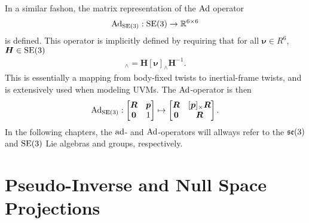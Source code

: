 In a similar fashon, the matrix representation of the $\operatorname{Ad}$ operator
\begin{align}
    \operatorname{Ad}_{\operatorname{SE}(3)} : \operatorname{SE}(3) \to \mathbb{R}^{6 \times 6}
\end{align}
is defined. This operator is implicitly defined by requiring that for all
$\bm{\nu} \in R^6$, $\bm{H} \in \operatorname{SE}(3)$
\begin{align}
    [\Ad(\bm{H})\bm{\nu}]_{\wedge} = \bm{H} [\bm{\nu}]_{\wedge} \bm{H}^{-1}.
\end{align}
This is essentially a mapping from body-fixed twists to inertial-frame twists,
and is extensively used when modeling UVMs. The $\operatorname{Ad}$-operator is then
\begin{align}
    \operatorname{Ad}_{\operatorname{SE}(3)} : \begin{bmatrix}
        \bm{R} & \bm{p} \\
        \bm{0} & 1
    \end{bmatrix}
    \mapsto
    \begin{bmatrix}
        \bm{R} & [\bm{p}]_{\times} \bm{R} \\
        \bm{0} & \bm{R}
    \end{bmatrix}.
\end{align}
In the following chapters, the $\operatorname{ad}$- and $\operatorname{Ad}$-operators will allways refer to
the $\mathfrak{se}(3)$ and $\operatorname{SE}(3)$ Lie algebras and groups, respectively.

\section{Pseudo-Inverse and Null Space Projections}
\label{sec:pseudoinverse}

